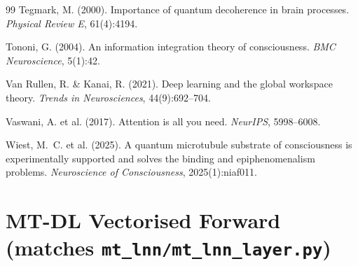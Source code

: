 \documentclass[11pt]{article}
\theoremstyle{definition}
\begin{document}
\begin{thebibliography}{99}
Tegmark, M. (2000). Importance of quantum decoherence in brain processes. \textit{Physical Review E}, 61(4):4194.

Tononi, G. (2004). An information integration theory of consciousness. \textit{BMC Neuroscience}, 5(1):42.

Van Rullen, R. \& Kanai, R. (2021). Deep learning and the global workspace theory. \textit{Trends in Neurosciences}, 44(9):692--704.

Vaswani, A. et al. (2017). Attention is all you need. \textit{NeurIPS}, 5998--6008.

Wiest, M.~C. et al. (2025). A quantum microtubule substrate of consciousness is experimentally supported and solves the binding and epiphenomenalism problems. \textit{Neuroscience of Consciousness}, 2025(1):niaf011.

\end{thebibliography}

\appendix

\section{MT-DL Vectorised Forward (matches \texttt{mt\_lnn/mt\_lnn\_layer.py})}
\label{app:code}
\end{document}
